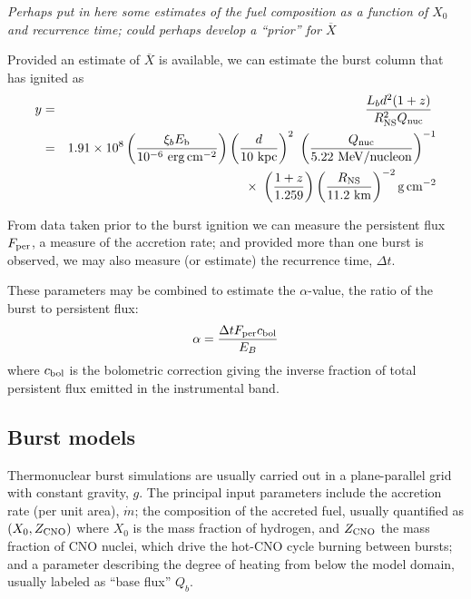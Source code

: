 \documentclass{aastex61}
\newcommand{\epc}{{\rm erg\,cm^{-2}}}
\newcommand{\Xb}{\ensuremath{\overline{X}}}
\begin{document}
{\it Perhaps put in here some estimates of the fuel composition as a function of $X_0$ and recurrence time; could perhaps develop a ``prior'' for $\Xb$ }

Provided an estimate of $\Xb$ is available, we can estimate the burst column that has ignited as
\begin{eqnarray}
y & = & \frac{L_b d^2 (1+z)}{R_{\rm NS}^2 Q_{\rm nuc}}\ 
                                                            \nonumber \\
  & = & 1.91\times10^8 \left(\frac{\xi_b E_{\rm b}}{10^{-6}\ \epc}\right)
                      \left(\frac{d}{10\ {\rm kpc}}\right)^2\
             \left(\frac{Q_{\rm nuc}}{5.22\ {\rm MeV/nucleon}}\right)^{-1}
\nonumber \\ & & \times\  %
                      \left(\frac{1+z}{1.259}\right)
                      \left(\frac{R_{\rm NS}}{11.2\ {\rm km}}\right)^{-2}
                      {\rm g\,cm^{-2}}
\label{column}
\end{eqnarray}

From data taken prior to the burst ignition we can measure the persistent flux $F_{\rm per}$, a measure of the accretion rate; and provided more than one burst is observed, we may also measure (or estimate) the recurrence time, $\Delta t$. 

These parameters may be combined to estimate the $\alpha$-value, the ratio of the burst to persistent flux: 
\begin{equation}
\alpha = \frac{\Delta t F_{\rm per} c_{\rm bol}}{E_B}
\end{equation}
where $c_{\rm bol}$ is the bolometric correction giving the inverse fraction of total persistent flux emitted in the instrumental band.

\subsection{Burst models}
\label{subsec:models}

Thermonuclear burst simulations \cite[e.g. with {\sc kepler};][]{woos04} are usually carried out in a plane-parallel grid with constant gravity, $g$. The principal input parameters include the accretion rate (per unit area), $\dot{m}$; the composition of the accreted fuel, usually quantified as $(X_0, Z_{\rm CNO})$ where $X_0$ is the mass fraction of hydrogen, and $Z_{\rm CNO}$ the mass fraction of CNO nuclei, which drive the hot-CNO cycle burning between bursts; and a parameter describing the degree of heating from below the model domain, usually labeled as ``base flux'' $Q_b$.
\end{document}
